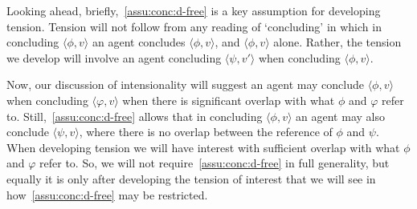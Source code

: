 \begin{note}
  Looking ahead, briefly,~\autoref{assu:conc:d-free} is a key assumption for developing tension.
  Tension will not follow from any reading of `concluding' in which in concluding \(\langle \phi,v \rangle\) an agent concludes \(\langle \phi,v \rangle\), and \(\langle \phi,v \rangle\) alone.
  Rather, the tension we develop will involve an agent concluding \(\langle \psi,v' \rangle\) when concluding \(\langle \phi,v \rangle\).

  Now, our discussion of intensionality will suggest an agent may conclude \(\langle \phi,v \rangle\) when concluding \(\langle \varphi, v \rangle\) when there is significant overlap with what \(\phi\) and \(\varphi\) refer to.
  Still,~\autoref{assu:conc:d-free} allows that in concluding \(\langle \phi,v \rangle\) an agent may also conclude \(\langle \psi,v \rangle\), where there is no overlap between the reference of \(\phi\) and \(\psi\).
  When developing tension we will have interest with sufficient overlap with what \(\phi\) and \(\varphi\) refer to.
  So, we will not require~\autoref{assu:conc:d-free} in full generality, but equally it is only after developing the tension of interest that we will see in how~\autoref{assu:conc:d-free} may be restricted.
\end{note}

